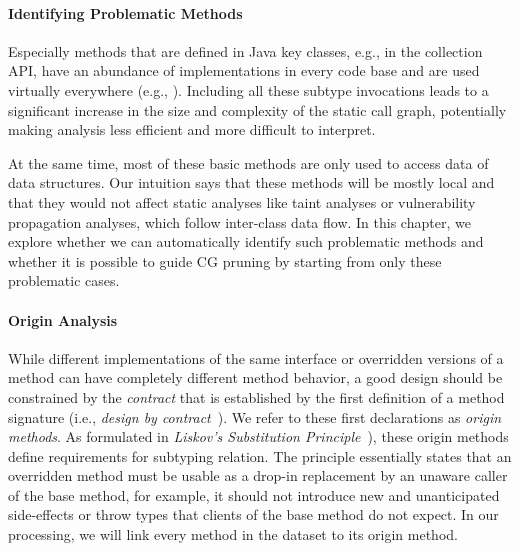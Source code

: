 \paragraph{Identifying Problematic Methods}
Especially methods that are defined in Java key classes, e.g., in the collection API, have an abundance of implementations in every code base and are used virtually everywhere (e.g., ).
Including all these subtype invocations leads to a significant increase in the size and complexity of the static call graph, potentially making analysis less efficient and more difficult to interpret.

At the same time, most of these basic methods are only used to access data of data structures.
Our intuition says that these methods will be mostly local and that they would not affect static analyses like taint analyses or vulnerability propagation analyses, which follow inter-class data flow.
In this chapter, we explore whether we can automatically identify such problematic methods and whether it is possible to guide CG pruning by starting from only these problematic cases.

\paragraph{Origin Analysis}
While different implementations of the same interface or overridden versions of a method can have completely different method behavior, a good design should be constrained by the \emph{contract} that is established by the first definition of a method signature (i.e., \emph{design by contract}~\cite{meyer2002design}).
We refer to these first declarations as \emph{origin methods}.
As formulated in \emph{Liskov's Substitution Principle}~\cite{LSP}), these origin methods define requirements for subtyping relation.
The principle essentially states that an overridden method must be usable as a drop-in replacement by an unaware caller of the base method, for example, it should not introduce new and unanticipated side-effects or throw  types that clients of the base method do not expect.
In our processing, we will link every method in the dataset to its origin method.

